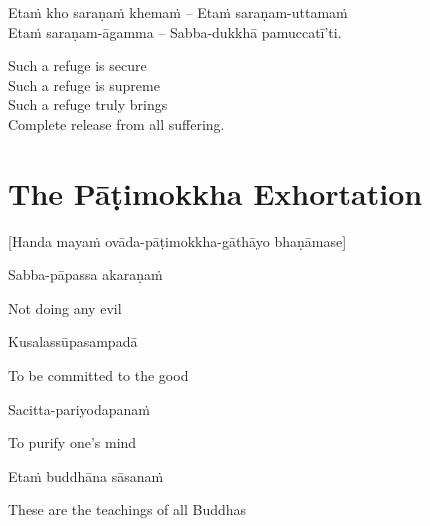 \begin{twochants}
  Etaṁ kho saraṇaṁ khemaṁ – Etaṁ saraṇam-uttamaṁ\\
  Etaṁ saraṇam-āgamma – Sabba-dukkhā pamuccatī'ti.
\end{twochants}

\begin{english}
  Such a refuge is secure\\
  Such a refuge is supreme\\
  Such a refuge truly brings\\
  Complete release from all suffering.
\end{english}

\suttaRef{[Dhp 188-192]}


\section{The Pāṭimokkha Exhortation}
\label{patimokkha-exhortation}

\begin{center}
  [Handa mayaṁ ovāda-pāṭimokkha-gāthāyo bhaṇāmase]
\end{center}

Sabba-pāpassa akaraṇaṁ

\begin{english}
  Not doing any evil
\end{english}

Kusalassūpasampadā

\begin{english}
  To be committed to the good
\end{english}

Sacitta-pariyodapanaṁ

\begin{english}
  To purify one's mind
\end{english}

Etaṁ buddhāna sāsanaṁ

\begin{english}
  These are the teachings of all Buddhas
\end{english}

